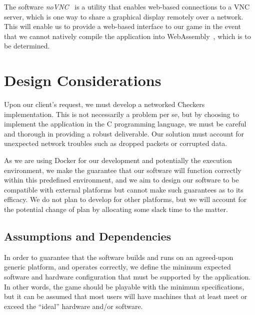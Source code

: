 \documentclass[letterpaper]{article}
\begin{document}
The software \emph{noVNC}~\cite{vnc} is a utility that enables
web-based connections to a VNC server, which is one way to share
a graphical display remotely over a network. This will enable us
to provide a web-based interface to our game in the event that
we cannot natively compile the application into
WebAssembly~\cite{webassembly}, which is to be determined.


\section{Design Considerations}
\label{sec:design}

Upon our client's request, we must develop a networked Checkers
implementation. This is not necessarily a problem per se, but by
choosing to implement the application in the C programming
language, we must be careful and thorough in providing a robust
deliverable. Our solution must account for unexpected network
troubles such as dropped packets or corrupted data.

As we are using Docker for our development and potentially the
execution environment, we make the guarantee that our software
will function correctly within this predefined environment, and
we aim to design our software to be compatible with external
platforms but cannot make such guarantees as to its efficacy. We
do not plan to develop for other platforms, but we will account
for the potential change of plan by allocating some slack time
to the matter.

\subsection{Assumptions and Dependencies}
\label{sec:design_assumptions}

In order to guarantee that the software builds and runs on an
agreed-upon generic platform, and operates correctly, we define
the minimum expected software and hardware configuration that
must be supported by the application. In other words, the game
should be playable with the minimum specifications, but it can
be assumed that most users will have machines that at least
meet or exceed the ``ideal'' hardware and/or software.
\end{document}
